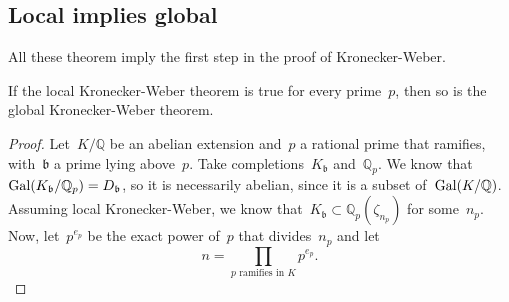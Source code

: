 \subsection{Local implies global}
All these theorem imply the first step in the proof of Kronecker-Weber.

\begin{theorem}
  If the local Kronecker-Weber theorem is true for every prime~$p$, then so is the global Kronecker-Weber theorem.

  \begin{proof}
    Let~$K/\mathbb{Q}$ be an abelian extension and~$p$ a rational prime that ramifies, with~$\mathfrak{b}$ a prime lying above~$p$. Take completions~$K_\mathfrak{b}$ and~$\mathbb{Q}_p$. We know that~$\operatorname{Gal}(K_\mathfrak{b}/\mathbb{Q}_p) = D_\mathfrak{b}$, so it is necessarily abelian, since it is a subset of~$\operatorname{Gal}(K/\mathbb{Q})$. Assuming local Kronecker-Weber, we know that~$K_\mathfrak{b} \subset \mathbb{Q}_p(\zeta_{n_p})$ for some~$n_p$. Now, let~$p^{e_p}$ be the exact power of~$p$ that divides~$n_p$ and let
    \begin{equation}
      n = \prod_{p \text{ ramifies in } K} p^{e_p}. 
    \end{equation}


\end{proof}
\end{theorem}

